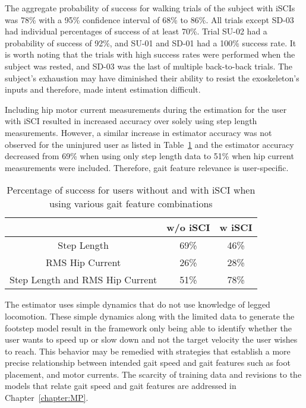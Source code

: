 

The aggregate probability of success for walking trials of the subject with iSCIs was 78\% with a 95\% confidence interval of 68\% to 86\%. All trials except SD-03 had individual percentages of success of at least 70\%. Trial SU-02 had a probability of success of 92\%, and SU-01 and SD-01 had a 100\% success rate. It is worth noting that the trials with high success rates were performed when the subject was rested, and SD-03 was the last of multiple back-to-back trials. The subject's exhaustion may have diminished their ability to resist the exoskeleton's inputs and therefore, made intent estimation difficult. 

Including hip motor current measurements during the estimation for the user with iSCI resulted in increased accuracy over solely using step length measurements. However, a similar increase in estimator accuracy was not observed for the uninjured user as listed in Table~\ref{table:gait_feature_relevance} and the estimator accuracy decreased from 69\% when using only step length data to 51\% when hip current measurements were included. Therefore, gait feature relevance is user-specific.

\begin{table}
	\centering
	\caption{Percentage of success for users without and with iSCI when using various gait feature combinations}\label{table:gait_feature_relevance}
	\begin{tabular}{|c|c|c|}
		\hline
	\backslashbox{Gait Features}{Subject}	& w/o iSCI & w iSCI \\
		\hline
	Step Length	& 69\% & 46\% \\
		\hline
	RMS Hip Current	& 26\% & 28\% \\
		\hline
	Step Length and RMS Hip Current	& 51\% & 78\% \\
		\hline
	\end{tabular}
\end{table}

The estimator uses simple dynamics that do not use knowledge of legged locomotion. These simple dynamics along with the limited data to generate the footstep model result in the framework only being able to identify whether the user wants to speed up or slow down and not the target velocity the user wishes to reach. This behavior may be remedied with strategies that establish a more precise relationship between intended gait speed and gait features such as foot placement, and motor currents. The scarcity of training data and revisions to the models that relate gait speed and gait features are addressed in Chapter~\ref{chapter:MP}.

